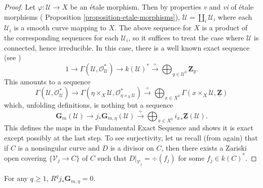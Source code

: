 \begin{proof}
Let $\varphi : \mathcal{U} \to X$ be an \'etale morphism. Then by properties
{\it v} and {\it vi} of \'etale morphisms (
Proposition \ref{proposition-etale-morphisms}),
$\mathcal{U} = \coprod_i \mathcal{U}_i$ where
each $\mathcal{U}_i$ is a smooth curve mapping to $X$. The above sequence for
$X$ is a product of the corresponding sequences for each $\mathcal{U}_i$, so it
suffices to treat the case where $\mathcal{U}$ is connected, hence irreducible.
In this case, there is a well known exact sequence (see \cite{H})
$$
1 \longrightarrow
\Gamma(\mathcal{U},\mathcal{O}_\mathcal{U}^*) \longrightarrow
k(\mathcal{U})^* \xrightarrow{\ \div\ }
\bigoplus_{y \in \mathcal{U}^0} \mathbf{Z}_y.
$$
This amounts to a sequence
$$
\Gamma(\mathcal{U},\mathcal{O}_\mathcal{U}^*) \longrightarrow
\Gamma(\eta\times_X\mathcal{U},\mathcal{O}_{\eta\times_X\mathcal{U}}^*)
\xrightarrow{\ \div\ } \bigoplus_{x \in X^0}
\Gamma(x\times_X\mathcal{U},\underline{\mathbf{Z}})
$$
which, unfolding definitions, is nothing but a sequence
$$
\mathbf{G}_m(\mathcal{U}) \longrightarrow j_* \mathbf{G}_{m,\eta}(\mathcal{U})
\xrightarrow{\ \div\ } \bigoplus_{x \in X^0} {i_x}_* \underline{\mathbf{Z}}
(\mathcal{U}).
$$
This defines the maps in the Fundamental Exact Sequence and shows it is exact
except possibly at the last step. To see surjectivity, let us recall (from
\cite{H} again) that if $C$ is a nonsingular curve and $D$ is a divisor on $C$,
then there exists a Zariski open covering $\{ \mathcal{V}_j \to C \}$ of $C$
such that $D |_{\mathcal{V}_j} = \div(f_j)$ for some $f_j \in k(C)^*$.
\end{proof}

\begin{lemma}
\label{lemma-higher-direct-jstar-Gm}
For any $q \geq 1$, $R^q j_*\mathbf{G}_{m,\eta} = 0$.
\end{lemma}

